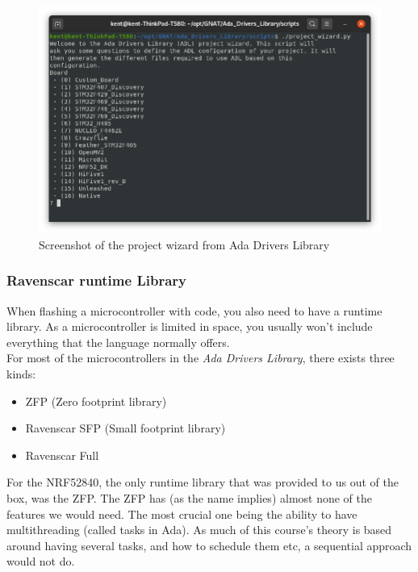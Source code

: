 \documentclass{article}
\begin{document}
\begin{figure}[H]
  \centering
  \includegraphics[width=\linewidth]{projectwizard.png}
  \caption{Screenshot of the project wizard from Ada Drivers Library}
  \label{projectWizard}
\end{figure}
\subsubsection{Ravenscar runtime Library}

When flashing a microcontroller with code, you also need to have a runtime library. As a microcontroller is limited in space, you usually won't include everything that the language normally offers.\\

For most of the microcontrollers in the \textit{Ada Drivers Library}, there exists three kinds:
\begin{itemize}
  \item{ZFP (Zero footprint library)}
  \item{Ravenscar SFP (Small footprint library)}
  \item{Ravenscar Full}
\end{itemize}

For the NRF52840, the only runtime library that was provided to us out of the box, was the ZFP. The ZFP has (as the name implies) almost none of the features we would need. The most crucial one being the ability to have multithreading (called tasks in Ada). As much of this course's theory is based around having several tasks, and how to schedule them etc, a sequential approach would not do.\\
\end{document}
